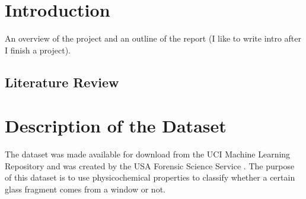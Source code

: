 \documentclass[12pt,halfline,a4paper]{ouparticle}
\begin{document}
\section{Introduction}
\label{sec2}
An overview of the project and an outline of the report (I like to write intro after I finish a project).

\subsection{Literature Review}
\label{sec3}

\section{Description of the Dataset}
\label{sec4}
The dataset was made available for download from the UCI Machine Learning Repository and was created by the USA Forensic Science Service \cite{murphy1994}. The purpose of this dataset is to use physicochemical properties to classify whether a certain glass fragment comes from a window or not. 
\end{document}
